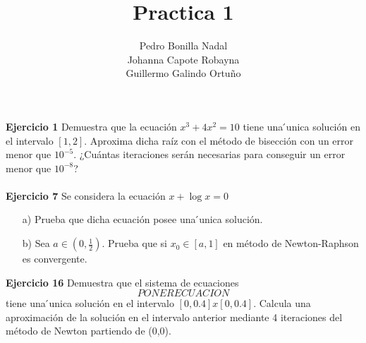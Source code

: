 \documentclass[11pt]{article}
\title{\textbf{Practica 1}}
\author{Pedro Bonilla Nadal\\
		Johanna Capote Robayna\\
		Guillermo Galindo Ortuño}
\date{}
\begin{document}
\maketitle

\textbf{Ejercicio 1}
Demuestra que la ecuaci\'on $x^3 + 4x^2 = 10 $ tiene una  ́unica soluci\'on en el intervalo $ [1,2] $. Aproxima dicha ra\'iz con el m\'etodo de bisecci\'on con un error menor que $10^{-5}$. ¿Cu\'antas iteraciones ser\'an necesarias para conseguir un error menor que $10^{-8}$?
\\
\\
\textbf{Ejercicio 7}
Se considera la ecuaci\'on $x + \log x = 0$ 
\begin{itemize}

\item[a)]Prueba que dicha ecuaci\'on posee una ́unica soluci\'on.
\item[b)] Sea $a \in (0, \frac{1}{2})$. Prueba que  si $x_0 \in [a,1]$ en m\'etodo de Newton-Raphson es convergente.

\end{itemize}
\textbf{Ejercicio 16} 
Demuestra que el sistema de ecuaciones
$$PONER ECUACION $$
tiene una  ́unica soluci\'on en el intervalo $[0, 0.4]x[0, 0.4]$. Calcula una aproximaci\'on de la soluci\'on en el intervalo anterior mediante 4 iteraciones del m\'etodo de Newton partiendo de (0,0).
\end{document}
